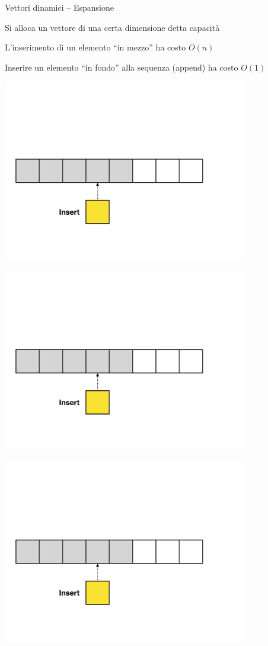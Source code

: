 \begin{frame}{Vettori dinamici -- Espansione}

\begin{myboxtitle}
\BI
\item Si alloca un vettore di una certa dimensione detta \alert{capacità}
\item L'inserimento di un elemento “in mezzo”  ha costo $O(n)$
\item Inserire un elemento “in fondo” alla sequenza (\alert{append}) ha costo $O(1)$
\EI
\end{myboxtitle}

\begin{overprint}
\centerline{\includegraphics[width=0.8\textwidth,page=1]{append-insert.pdf}}
\centerline{\includegraphics[width=0.8\textwidth,page=2]{append-insert.pdf}}
\centerline{\includegraphics[width=0.8\textwidth,page=3]{append-insert.pdf}}

\end{overprint}
\end{frame}
